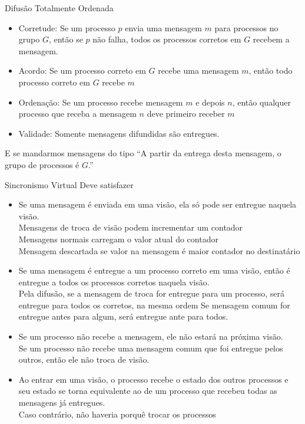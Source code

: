 \begin{frame}{Difusão Totalmente Ordenada}
\begin{itemize}
	\item Corretude: Se um processo $p$ envia uma mensagem $m$ para processos no grupo $G$, então se $p$ não falha, todos os processos corretos em $G$ recebem a mensagem.
	
	\item Acordo: Se um processo correto em $G$ recebe uma mensagem $m$, então todo processo correto em $G$ recebe $m$
	
	\item Ordenação: Se um processo recebe mensagem $m$ e depois $n$, então qualquer processo que receba a mensagem $n$ deve primeiro receber $m$
	
	\item Validade: Somente mensagens difundidas são entregues.
\end{itemize}

E se mandarmos mensagens do tipo ``A partir da entrega desta mensagem, o grupo de processos é $G$.''
\end{frame}

\begin{frame}{Sincronismo Virtual}
Deve satisfazer
\begin{itemize}
	\item Se uma mensagem é enviada em uma visão, ela só pode ser entregue naquela visão.\\
	Mensagens de troca de visão podem incrementar um contador\\
	Mensagens normais carregam o valor atual do contador\\
	Mensagem descartada se valor na mensagem é maior contador no destinatário
	
	\item Se uma mensagem é entregue a um processo correto em uma visão, então é entregue a todos os processos corretos naquela visão.\\
	Pela difusão, se a mensagem de troca for entregue para um processo, será entregue para todos os corretos, na mesma ordem
	Se mensagem comum for entregue antes para algum, será entregue ante para todos.
	
	\item Se um processo não recebe a mensagem, ele não estará na próxima visão.\\
	Se um processo não recebe uma mensagem comum que foi entregue pelos outros, então ele não troca de visão.

	\item Ao entrar em uma visão, o processo recebe o estado dos outros processos e seu estado se torna equivalente ao de um processo que recebeu todas as mensagens já entregues.\\
	Caso contrário, não haveria porquê trocar os processos
\end{itemize}
\end{frame}

